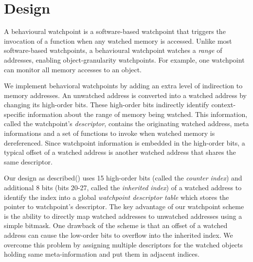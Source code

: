 \documentclass[letterpaper,twocolumn,10pt]{article}
\newenvironment{enumerate*}%
  {\begin{enumerate}%
    \setlength{\itemsep}{2pt}%
    \setlength{\parskip}{0pt}}%
  {\end{enumerate}}
\begin{document}

\section{Design}\label{sec:design}
A behavioural watchpoint is a software-based watchpoint that triggers the invocation of a function when any watched memory is accessed. Unlike most software-based watchpoints, a behavioural watchpoint watches a \emph{range} of addresses, enabling object-granularity watchpoints. For example, one watchpoint can monitor all memory accesses to an object.


We implement behavioral watchpoints by adding an extra level of indirection to memory addresses. An unwatched address is converted into a watched address by changing its high-order bits. These high-order bits indirectly identify context-specific information about the range of memory being watched. This information, called the watchpoint's \emph{descriptor}, contains the originating watched address, meta informations and a set of functions to invoke when watched memory is dereferenced. Since watchpoint information is embedded in the high-order bits, a typical offset of a watched address is another watched address that shares the same descriptor. 

Our design as described() uses 15 high-order bits (called the \emph{counter index}) and additional 8 bits (bits 20-27, called the \emph{inherited index}) of a watched address to identify the index into a global \emph{watchpoint descriptor table} which stores the pointer to watchpoint's descriptor. %
The key advantage of our watchpoint scheme is the ability to directly map watched addresses to unwatched addresses using a simple bitmask. One drawback of the scheme is that an offset of a watched address can cause the low-order bits to overflow into the inherited index. We overcome this problem by assigning multiple descriptors for the watched objects holding same meta-information and put them in adjacent indices. 
\end{document}
